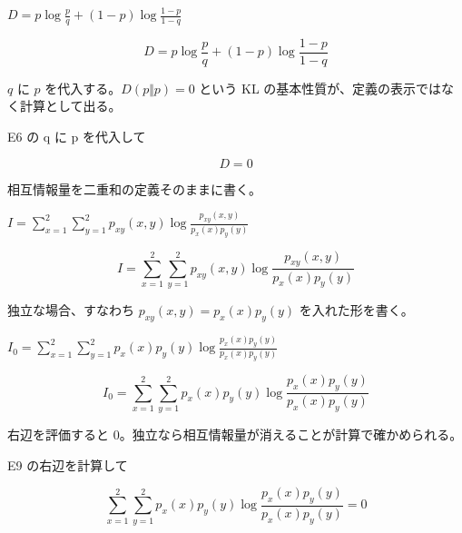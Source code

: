 \documentclass[dvipdfmx,a4paper,11pt]{jsarticle}
\begin{document}
$D = p\log \frac{p}{q} + (1-p)\log \frac{1-p}{1-q}$

\begin{equation}
  D = p\log \frac{p}{q} + (1-p)\log \frac{1-p}{1-q}
  \label{eq:E6}
\end{equation}

$q$ に $p$ を代入する。$D(p\Vert p)=0$ という KL の基本性質が、定義の表示ではなく計算として出る。

E6 の q に p を代入して

\begin{equation}
  D = 0
  \label{eq:E7}
\end{equation}

相互情報量を二重和の定義そのままに書く。

$I = \sum_{x=1}^{2}\sum_{y=1}^{2} p_{xy}(x,y)\log \frac{p_{xy}(x,y)}{p_x(x) p_y(y)}$

\begin{equation}
  I = \sum_{x=1}^{2}\sum_{y=1}^{2} p_{xy}(x,y)\log \frac{p_{xy}(x,y)}{p_x(x) p_y(y)}
  \label{eq:E8}
\end{equation}

独立な場合、すなわち $p_{xy}(x,y)=p_x(x)p_y(y)$ を入れた形を書く。

$I_0 = \sum_{x=1}^{2}\sum_{y=1}^{2} p_x(x) p_y(y)\log \frac{p_x(x) p_y(y)}{p_x(x) p_y(y)}$

\begin{equation}
  I_0 = \sum_{x=1}^{2}\sum_{y=1}^{2} p_x(x) p_y(y)\log \frac{p_x(x) p_y(y)}{p_x(x) p_y(y)}
  \label{eq:E9}
\end{equation}

右辺を評価すると 0。独立なら相互情報量が消えることが計算で確かめられる。

E9 の右辺を計算して

\begin{equation}
  \sum_{x=1}^{2}\sum_{y=1}^{2} p_x(x) p_y(y)\log \frac{p_x(x) p_y(y)}{p_x(x) p_y(y)} = 0
  \label{eq:E10}
\end{equation}
\end{document}
